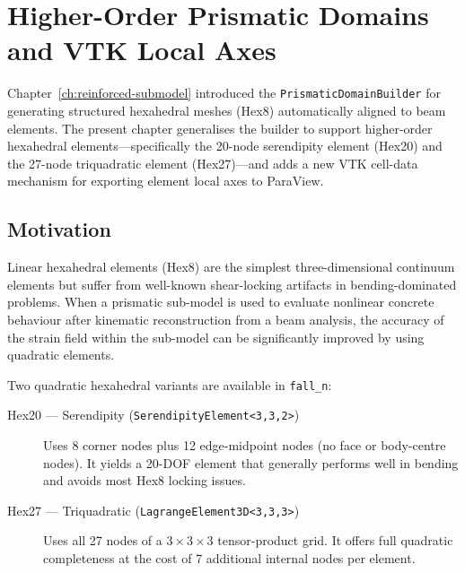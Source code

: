 
\chapter{Higher-Order Prismatic Domains and VTK Local Axes}
\label{ch:ho-prismatic-domain}

Chapter~\ref{ch:reinforced-submodel} introduced the
\texttt{PrismaticDomainBuilder} for generating structured hexahedral
meshes (Hex8) automatically aligned to beam elements.  The present
chapter generalises the builder to support higher-order hexahedral
elements---specifically the 20-node serendipity element (Hex20) and the
27-node triquadratic element (Hex27)---and adds a new VTK cell-data
mechanism for exporting element local axes to ParaView.


\section{Motivation}
\label{sec:ho-prism-motivation}

Linear hexahedral elements (Hex8) are the simplest three-dimensional
continuum elements but suffer from well-known shear-locking artifacts
in bending-dominated problems.  When a prismatic sub-model is used to
evaluate nonlinear concrete behaviour after kinematic reconstruction
from a beam analysis, the accuracy of the strain field within the
sub-model can be significantly improved by using quadratic elements.

Two quadratic hexahedral variants are available in \texttt{fall\_n}:

\begin{description}
  \item[Hex20 — Serendipity (\texttt{SerendipityElement<3,3,2>})]
        Uses 8 corner nodes plus 12 edge-midpoint nodes (no face or
        body-centre nodes).  It yields a 20-DOF element that generally
        performs well in bending and avoids most Hex8 locking issues.
  \item[Hex27 — Triquadratic (\texttt{LagrangeElement3D<3,3,3>})]
        Uses all 27 nodes of a $3\times 3\times 3$ tensor-product grid.
        It offers full quadratic completeness at the cost of 7 additional
        internal nodes per element.
\end{description}

